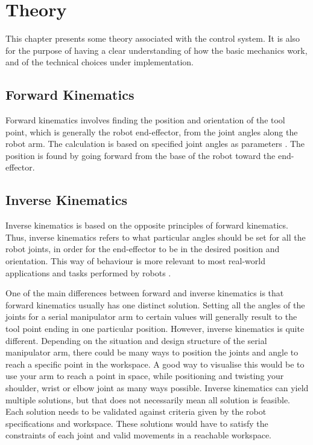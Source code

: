\chapter{Theory}
\label{chap:theory}
This chapter presents some theory associated with the control system. It is also for the purpose of having a clear understanding of how the basic mechanics work, and of the technical choices under implementation. 

\section{Forward Kinematics}

Forward kinematics involves finding the position and orientation of the tool point, which is generally the robot end-effector, from the joint angles along the robot arm. The calculation is based on specified joint angles as parameters \cite{forward_kinematics}. The position is found by going forward from the base of the robot toward the end-effector. 

\section{Inverse Kinematics}

Inverse kinematics is based on the opposite principles of forward kinematics. Thus, inverse kinematics refers to what particular angles should be set for all the robot joints, in order for the end-effector to be in the desired position and orientation. This way of behaviour is more relevant to most real-world applications and tasks performed by robots \cite{inverse_kinematics}. 

One of the main differences between forward and inverse kinematics is that forward kinematics usually has one distinct solution. Setting all the angles of the joints for a serial manipulator arm to certain values will generally result to the tool point ending in one particular position. However, inverse kinematics is quite different. Depending on the situation and design structure of the serial manipulator arm, there could be many ways to position the joints and angle to reach a specific point in the workspace. A good way to visualise this would be to use your arm to reach a point in space, while positioning and twisting your shoulder, wrist or elbow joint as many ways possible. Inverse kinematics can yield multiple solutions, but that does not necessarily mean all solution is feasible. Each solution needs to be validated against criteria given by the robot specifications and workspace. These solutions would have to satisfy the constraints of each joint and valid movements in a reachable workspace.


